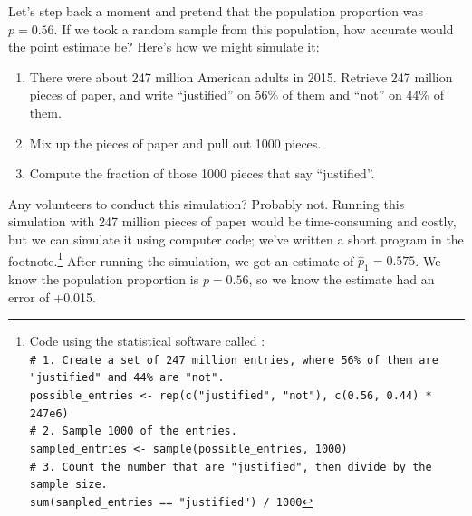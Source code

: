Let's step back a moment and pretend that the population proportion
was $p = 0.56$. If we took a random sample from this population, how
accurate would the point estimate be? Here's how we might simulate it:
\begin{enumerate}
\item There were about 247 million American adults in 2015. Retrieve
    247 million pieces of paper, and write ``justified'' on 56\% of
    them and ``not'' on 44\% of them.
\item Mix up the pieces of paper and pull out 1000 pieces.
\item Compute the fraction of those 1000 pieces that say ``justified''.
\end{enumerate}
Any volunteers to conduct this simulation? Probably not. Running
this simulation with 247 million pieces of paper would be
time-consuming and costly, but we can simulate it
using computer code; we've written a short program in the
footnote.\footnote{Code using the statistical software called \R: \\
\texttt{\# 1. Create a set of 247 million entries,
where 56\% of them are "justified" and 44\% are "not". \\
possible\_entries <- rep(c("justified", "not"), c(0.56, 0.44) * 247e6)\\
\# 2. Sample 1000 of the entries. \\
sampled\_entries <- sample(possible\_entries, 1000) \\
\# 3. Count the number that are "justified", then divide
by the sample size. \\
sum(sampled\_entries == "justified") / 1000}}
After running the simulation, we got an estimate
of $\hat{p}_1 = 0.575$. We know the population proportion
is $p = 0.56$, so we know the estimate had an error of +0.015.


